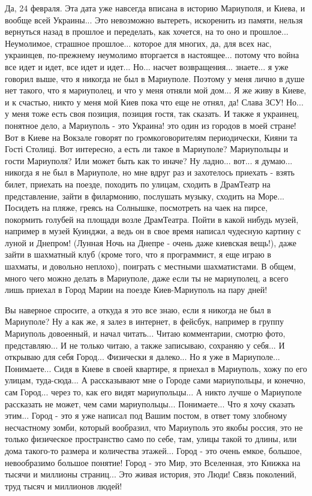 Да, 24 февраля.  Эта дата уже навсегда вписана в историю Мариуполя, и Киева, и
вообще всей Украины... Это невозможно вытереть, искоренить из памяти, нельзя
вернуться назад в прошлое и переделать, как хочется, на то оно и прошлое...
Неумолимое, страшное прошлое... которое для многих, да, для всех нас,
украинцев, по-прежнему неумолимо вторгается в настоящее...  потому что война
все идет и идет, все идет и идет...  Но...  насчет возвращения...  знаете... я
уже говорил выше, что я никогда не был в Мариуполе. Поэтому у меня лично в душе
нет такого, что я мариуполец, и что у меня отняли мой дом...  Я же живу в
Киеве, и к счастью, никто у меня мой Киев пока что еще не отнял, да! Слава ЗСУ!
Но... у меня тоже есть своя позиция, позиция гостя, так сказать. И также я
украинец, понятное дело, а Мариуполь - это Украина!  это один из городов в моей
стране!  Вот в Киеве на Вокзале говорят по громкоговорителям периодически,
Кияни та Гості Столиці. Вот интересно, а есть ли такое в Мариуполе? Мариупольцы
и гости Мариуполя? Или может быть как то иначе? Ну ладно... вот... я думаю...
никогда я не был в Мариуполе, но мне вдруг раз и захотелось приехать - взять
билет, приехать на поезде, походить по улицам, сходить в ДрамТеатр на
представление, зайти в филармонию, послушать музыку, сходить на Море...
Посидеть на пляже, греясь на Солнышке, посмотреть на чаек на пирсе, покормить
голубей на площади возле ДрамТеатра. Пойти в какой нибудь музей, например в
музей Куинджи, а ведь он в свое время написал чудесную картину с луной и
Днепром! (Лунная Ночь на Днепре - очень даже киевская вещь!), даже зайти в
шахматный клуб (кроме того, что я программист, я еще играю в шахматы, и
довольно неплохо), поиграть с местными шахматистами. В общем, много чего можно
делать в Мариуполе, даже если ты не мариуполец, а всего лишь приехал в Город
Марии на поезде Киев-Мариуполь на пару дней!

Вы наверное спросите, а откуда я это все знаю, если я никогда не был в
Мариуполе?  Ну а как же, я залез в интернет, в фейсбук, например в группу
Мариуполь довоенный, и начал читать... Читаю комментарии, смотрю фото,
представляю... И не только читаю, а также записываю, сохраняю у себя... И
открываю для себя Город... Физически я далеко... Но я уже в Мариуполе...
Понимаете... Сидя в Киеве в своей квартире, я приехал в Мариуполь, хожу по его
улицам, туда-сюда... А рассказывают мне о Городе сами мариупольцы, и конечно,
сам Город... через то, как его видят мариупольцы... А никто лучше о Мариуполе
рассказать не может, чем сами мариупольцы... Понимаете...  Что я хочу сказать
этим... Город - это я уже написал под Вашим постом, в ответ тому злобному
несчастному зомби, который вообразил, что Мариуполь это якобы россия, это не
только физическое пространство само по себе, там, улицы такой то длины, или
дома такого-то размера и количества этажей... Город - это очень емкое, большое,
невообразимо большое понятие!  Город - это Мир, это Вселенная, это Книжка на
тысячи и миллионы страниц... Это живая история, это Люди! Связь поколений, труд
тысяч и миллионов людей! 

